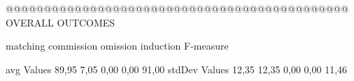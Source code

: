  @@@@@@@@@@@@@@@@@@@@@@@@@@@@@@@@@@@@@@@@@@@@@ OVERALL OUTCOMES

                matching commission   omission  induction   F-measure

avg Values       89,95       7,05       0,00       0,00       91,00        
stdDev Values    12,35       12,35       0,00       0,00        11,46        
